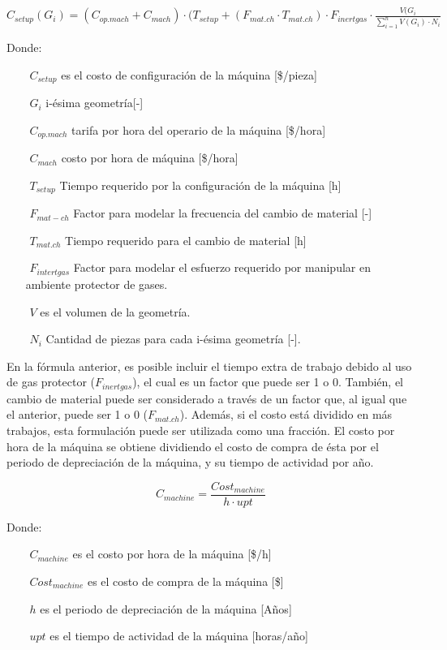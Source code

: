 \begin{description}
$C_{setup}(G_i)=(C_{op.mach}+C_{mach})\cdot(T_{setup}+(F_{mat.ch}\cdot T_{mat.ch})\cdot F_{inertgas}\cdot \frac{V(G_i}{\sum_{i=1}^{n} V(G_i)\cdot N_i}$

Donde:

\begin{itemize}
\item[$ $] $C_{setup} $ es el costo de configuración de la máquina [\$/pieza]
\item[$ $] $G_i $ i-ésima geometría[-]
\item[$ $] $C_{op.mach} $ tarifa por hora del operario de la máquina [\$/hora]
\item[$ $] $C_{mach} $ costo por hora de máquina [\$/hora]
\item[$ $] $T_{setup} $ Tiempo requerido por la configuración de la máquina [h]
\item[$ $] $F_{mat-ch} $ Factor para modelar la frecuencia del cambio de material [-]
\item[$ $] $T_{mat.ch} $ Tiempo requerido para el cambio de material [h]
\item[$ $] $F_{intertgas} $ Factor para modelar el esfuerzo requerido por manipular en ambiente protector de gases.
\item[$ $] $V $ es el volumen de la geometría.
\item[$ $] $N_i$ Cantidad de piezas para cada i-ésima geometría [-].


\end{itemize}

En la fórmula anterior, es posible incluir el tiempo extra de trabajo debido al uso de gas protector ($F_{inertgas}$), el cual es un factor que puede ser 1 o 0. También, el cambio de material puede ser considerado a través de un factor que, al igual que el anterior, puede ser 1 o 0 ($F_{mat.ch}$). Además, si el costo está dividido en más trabajos, esta formulación puede ser utilizada como una fracción.
El costo por hora de la máquina se obtiene dividiendo el costo de compra de ésta por el periodo de depreciación de la máquina, y su tiempo de actividad por año. 

\begin{equation*}
C_{machine}=\frac{Cost_{machine}}{h\cdot upt}
\end{equation*}

Donde:

\begin{itemize}
\item[$ $] $C_{machine}$ es el costo por hora de la máquina [\$/h]
\item[$ $] $Cost_{machine}$ es el costo de compra de la máquina [\$]
\item[$ $] $h$ es el periodo de depreciación de la máquina [Años]
\item[$ $] $upt$ es el tiempo de actividad de la máquina [horas/año]


\end{itemize}
\end{description}
